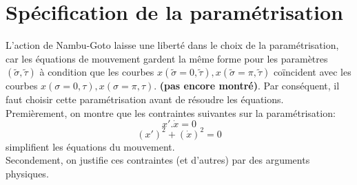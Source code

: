 \documentclass[a4paper,12pt]{article}
\begin{document}
\section{Spécification de la paramétrisation}
L'action de Nambu-Goto laisse une liberté dans le choix de la paramétrisation, car les équations de mouvement gardent la même forme pour les paramètres $(\tilde{\sigma},\tilde{\tau})$ à condition que les courbes $x(\tilde{\sigma}=0,\tilde{\tau}), x(\tilde{\sigma}=\pi,\tilde{\tau})$ coïncident avec les courbes $x(\sigma=0,\tau), x(\sigma=\pi,\tau)$. \textbf{(pas encore montré)}.
Par conséquent, il faut choisir cette paramétrisation avant de résoudre les équations.\\
Premièrement, on montre que les contraintes suivantes sur la paramétrisation:
\begin{equation}
x'. \dot{x}=0\label{contrainte1}
\end{equation}
\begin{equation}
\left( x'\right) ^{2}+\left(\dot{x}\right) ^{2}=0\label{contrainte2}
\end{equation}
simplifient les équations du mouvement.\\ Secondement, on justifie ces contraintes (et d'autres) par des arguments physiques. 
\end{document}
